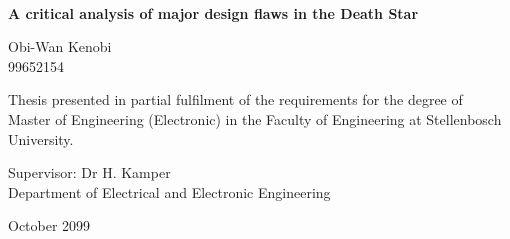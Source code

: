 \graphicspath{{frontmatter/fig/}}

\begin{titlepage}
\begin{center}



~\vspace{4.5em}

{\sffamily \bfseries \huge A critical analysis of major design flaws in the Death Star \par}

\vspace{7em}

{\large {\Large Obi-Wan Kenobi} \\ 99652154 \par}

\vspace{8em}

{\large Thesis presented in partial fulfilment of the requirements for the degree of \\ Master of Engineering (Electronic) in the Faculty of Engineering at Stellenbosch University. \par}

\vfill

{\large {Supervisor}: Dr H. Kamper \\
Department of Electrical and Electronic Engineering \par}

\vspace{10em}

{\Large October 2099}
\end{center}
\end{titlepage}
